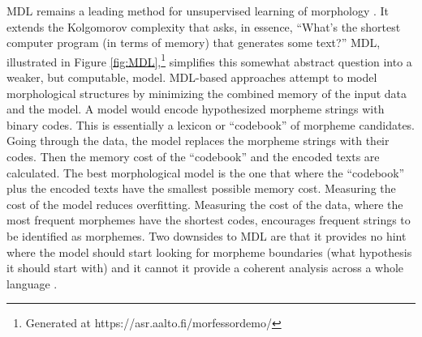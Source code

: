 \documentclass[12pt]{article}
\begin{document}
MDL remains a leading method for unsupervised learning of morphology \cite{hammarstrom_unsupervised_2011}. It extends the Kolgomorov complexity that asks, in essence, ``What's the shortest computer program (in terms of memory) that generates some text?'' MDL, illustrated in Figure \ref{fig:MDL},\footnote{Generated at https://asr.aalto.fi/morfessordemo/} simplifies this somewhat abstract question into a weaker, but computable, model. MDL-based approaches attempt to model morphological structures by minimizing the combined memory of the input data and the model. A model would encode hypothesized morpheme strings with binary codes. This is essentially a lexicon or ``codebook'' of morpheme candidates. Going through the data, the model replaces the morpheme strings with their codes. Then the memory cost of the ``codebook'' and the encoded texts are calculated. The best morphological model is the one that where the ``codebook'' plus the encoded texts have the smallest possible memory cost. Measuring the cost of the model reduces overfitting. Measuring the cost of the data, where the most frequent morphemes have the shortest codes, encourages frequent strings to be identified as morphemes. Two downsides to MDL are that it provides no hint where the model should start looking for morpheme boundaries (what hypothesis it should start with) and it cannot it provide a coherent analysis across a whole language \cite{goldsmith_computational_2017}.
\end{document}
